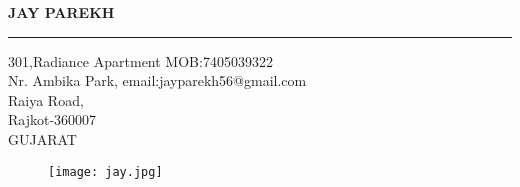 \documentclass{article}
\begin{document}
	\begin{center}
		\huge \textbf{JAY PAREKH}
	\end{center}
	 \hrule 
\vspace{0.1in} 
\begin{flushleft}
\large 301,Radiance Apartment \hspace{0.6in} MOB:7405039322 \\
Nr. Ambika Park, \hspace{1.1in} email:jayparekh56@gmail.com\\
Raiya Road, \\
Rajkot-360007 \\
GUJARAT
\end{flushleft}

\begin{figure}[h]
	\centering
	\hspace{2in}
	\texttt{[image: jay.jpg]}
	\label{fig_1}
\end{figure}
\end{document}
